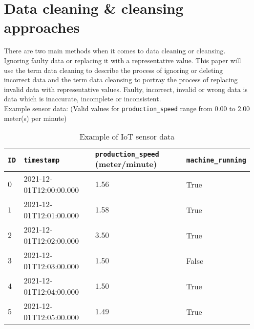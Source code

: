 \chapter{Data cleaning \& cleansing approaches}\label{chapter:data-cleaning-cleansing-approaches}
There are two main methods when it comes to data cleaning or cleansing. Ignoring faulty data or replacing it with a representative value. This paper will use the term data cleaning to describe the process of ignoring or deleting incorrect data and the term data cleansing to portray the process of replacing invalid data with representative values. Faulty, incorrect, invalid or wrong data is data which is inaccurate, incomplete or inconsistent.\\
Example sensor data: (Valid values for \verb|production_speed| range from $0.00$ to $2.00$ meter(s) per minute)
\begin{table}[ht]
\begin{tabular}{|l|l|l|l|}
\hline
\verb|ID| & \verb|timestamp|        & \verb|production_speed| (meter/minute) & \verb|machine_running| \\ \hline
$0$       & 2021-12-01T12:00:00.000 & $1.56$                                 & True                   \\ \hline
$1$       & 2021-12-01T12:01:00.000 & $1.58$                                 & True                   \\ \hline
$2$       & 2021-12-01T12:02:00.000 & $3.50$                                 & True                   \\ \hline
$3$       & 2021-12-01T12:03:00.000 & $1.50$                                 & False                  \\ \hline
$4$       & 2021-12-01T12:04:00.000 & $1.50$                                 & True                   \\ \hline
$5$       & 2021-12-01T12:05:00.000 & $1.49$                                 & True                   \\ \hline
\end{tabular}
\caption{Example of IoT sensor data}
\label{table:example-iot-data}
\end{table}
